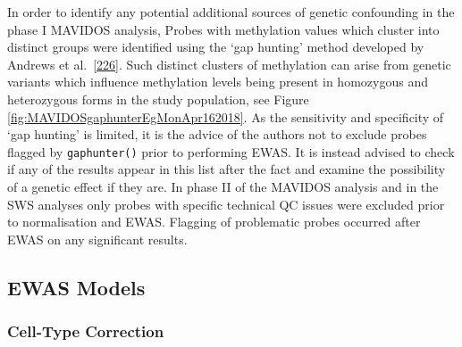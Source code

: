 \documentclass[
]{book}
\begin{document}
In order to identify any potential additional sources of genetic confounding in the phase I MAVIDOS analysis, Probes with methylation values which cluster into distinct groups were identified using the `gap hunting' method developed by Andrews et al.~{[}\protect\hyperlink{ref-Andrews2016}{226}{]}.
Such distinct clusters of methylation can arise from genetic variants which influence methylation levels being present in homozygous and heterozygous forms in the study population, see Figure \ref{fig:MAVIDOSgaphunterEgMonApr162018}.
As the sensitivity and specificity of `gap hunting' is limited, it is the advice of the authors not to exclude probes flagged by \texttt{gaphunter()} prior to performing EWAS.
It is instead advised to check if any of the results appear in this list after the fact and examine the possibility of a genetic effect if they are.
In phase II of the MAVIDOS analysis and in the SWS analyses only probes with specific technical QC issues were excluded prior to normalisation and EWAS.
Flagging of problematic probes occurred after EWAS on any significant results.

\hypertarget{ewas-models}{%
\subsection{EWAS Models}\label{ewas-models}}

\hypertarget{cell-type-correction}{%
\subsubsection{Cell-Type Correction}\label{cell-type-correction}}
\end{document}
